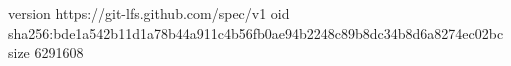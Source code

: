 version https://git-lfs.github.com/spec/v1
oid sha256:bde1a542b11d1a78b44a911c4b56fb0ae94b2248c89b8dc34b8d6a8274ec02bc
size 6291608
